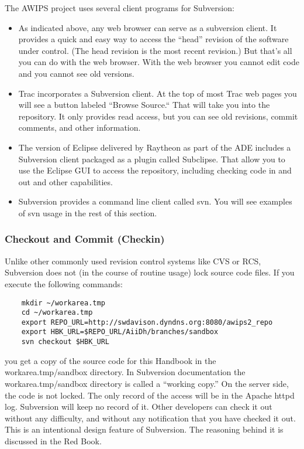 The AWIPS project uses several client programs for Subversion:
\begin{itemize}
\item
As indicated above, any web browser can serve as a
subversion client.
It provides a quick
and easy way to access the ``head'' revision of the software
under control.  (The head revision is the most recent
revision.)  But that's all you can do with the web
browser.  With the web browser you cannot edit code and
you cannot see old versions.
\item
Trac incorporates a Subversion client.  At the top of most
Trac web pages you will see a button labeled ``Browse
Source.``  That will take you into the repository.  It
only provides read access, but you can see old revisions,
commit comments, and other information.
\item
The version of Eclipse delivered by Raytheon as part of
the ADE includes a Subversion client packaged as a plugin
called Subclipse.  That allow you to use the Eclipse GUI
to access the repository, including checking code in and
out and other capabilities.
\item
Subversion provides a command line client called svn.  You
will see examples of svn usage in the rest of this section.
\end{itemize}


\subsubsection{Checkout and Commit (Checkin)}

Unlike other commonly used revision control systems like
CVS or RCS, Subversion does not (in the course of routine
usage) lock source code files.  If you execute the following
commands:
\begin{verbatim}
    mkdir ~/workarea.tmp
    cd ~/workarea.tmp
    export REPO_URL=http://swdavison.dyndns.org:8080/awips2_repo
    export HBK_URL=$REPO_URL/AiiDh/branches/sandbox
    svn checkout $HBK_URL
\end{verbatim}

you get a copy of the source code for this Handbook in the
workarea.tmp/sandbox directory.  In Subversion documentation
the workarea.tmp/sandbox directory is called a ``working
copy.''
On the server side, the code is
not locked.  The only record of the access will be in the
Apache httpd log.  Subversion will keep no record of it.
Other developers can check it out without any difficulty,
and without any notification that you have checked it out.
This is an intentional design feature of Subversion.  The
reasoning behind it is discussed in the Red Book.

